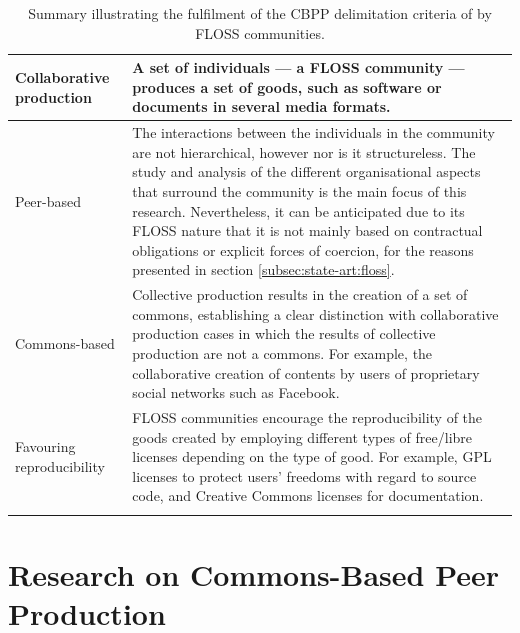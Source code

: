 \begin{longtable}{|p{2.5cm}||p{11cm}|}
\hline
Collaborative production  & A set of individuals --- a FLOSS community --- produces a set of goods, such as software or documents in several media formats. \\ \hline

Peer-based  & The interactions between the individuals in the community are not hierarchical, however nor is it structureless. The study and analysis of the different organisational aspects that surround the community is the main focus of this research. Nevertheless, it can be anticipated due to its FLOSS nature that it is not mainly based on contractual obligations or explicit forces of coercion, for the reasons presented in section \ref{subsec:state-art:floss}.\\ \hline

Commons-based  &  Collective production results in the creation of a set of commons, establishing a clear distinction with collaborative production cases in which the results of collective production are not a commons. For example, the collaborative creation of contents by users of proprietary social networks such as Facebook. \\ \hline

Favouring reproducibility  & FLOSS communities encourage the reproducibility of the goods created by employing different types of free/libre licenses depending on the type of good. For example, GPL licenses to protect users' freedoms with regard to source code, and Creative Commons licenses for documentation. \\ \hline

\caption[Fulfilment of the CBPP delimitation criteria by FLOSS communities]{Summary illustrating the fulfilment of the CBPP delimitation criteria of \textcite[3]{morell2016mayo} by FLOSS communities.}
\label{floss-cbpp-criteria}
\end{longtable}

\section{Research on Commons-Based Peer Production}
\label{sec:cbpp-research}

